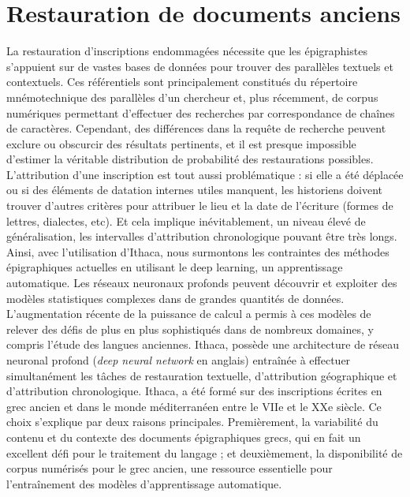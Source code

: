 \documentclass[12pt, french, twoside]{report}
\begin{document}
\section{Restauration de documents anciens}
\indent La restauration d'inscriptions endommagées nécessite que les épigraphistes s'appuient sur de vastes bases de données pour trouver des parallèles textuels et contextuels. Ces référentiels sont principalement constitués du répertoire mnémotechnique des parallèles d'un chercheur et, plus récemment, de corpus numériques permettant d'effectuer des recherches par \og correspondance de chaînes de caractères\fg. Cependant, des différences dans la requête de recherche peuvent exclure ou obscurcir des résultats pertinents, et il est presque impossible d'estimer la véritable distribution de probabilité des restaurations possibles. L'attribution d'une inscription est tout aussi problématique : si elle a été déplacée ou si des éléments de datation internes utiles manquent, les historiens doivent trouver d'autres critères pour attribuer le lieu et la date de l'écriture (formes de lettres, dialectes, etc). Et cela implique inévitablement, un niveau élevé de généralisation, les intervalles d'attribution chronologique pouvant être très longs.\\

Ainsi, avec l'utilisation d'Ithaca, nous surmontons les contraintes des méthodes épigraphiques actuelles en utilisant le deep learning, un apprentissage automatique. Les réseaux neuronaux profonds peuvent découvrir et exploiter des modèles statistiques complexes dans de grandes quantités de données. L'augmentation récente de la puissance de calcul a permis à ces modèles de relever des défis de plus en plus sophistiqués dans de nombreux domaines, y compris l'étude des langues anciennes.
Ithaca, possède une architecture de réseau neuronal profond (\textit{deep neural network} en anglais) entraînée à effectuer simultanément les tâches de restauration textuelle, d'attribution géographique et d'attribution chronologique. Ithaca, a été formé sur des inscriptions écrites en grec ancien et dans le monde méditerranéen entre le VIIe et le XXe siècle. Ce choix s'explique par deux raisons principales. Premièrement, la variabilité du contenu et du contexte des documents épigraphiques grecs, qui en fait un excellent défi pour le traitement du langage ; et deuxièmement, la disponibilité de corpus numérisés pour le grec ancien, une ressource essentielle pour l'entraînement des modèles d'apprentissage automatique.\\
\end{document}
